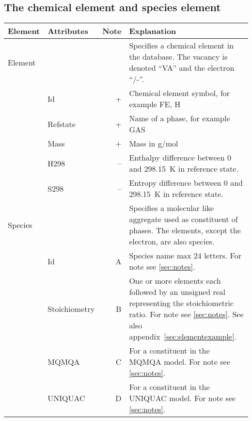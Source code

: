 \documentclass{article}
\begin{document}

\newpage

\subsection{The chemical element and species element}

\bigskip
\begin{tabular}{|p{} p{} r p{}|}\hline
  Element & Attributes & Note & Explanation\\\hline

  Element & && Specifies a chemical element in the database.  The vacancy is denoted ``VA'' and the electron ``/-''.\\
          & Id        & +    & Chemical element symbol, for example FE, H \\
          & Refstate  & +    & Name of a phase, for example GAS \\
          & Mass      & +    & Mass in g/mol\\
          & H298      & --    & Enthalpy difference between 0 and 298.15~K in reference state.\\
          & S298      & --    & Entropy difference between 0 and 298.15~K in reference state.\\\hline

  Species & && Specifies a molecular like aggregate used as constituent of phases.  The elements, except the electron, are also species.\\
          & Id        & A & Species name max 24 letters. For note see \ref{sec:notes}.\\
          & Stoichiometry & B & One or more elements each followed by an unsigned real representing the stoichiometric ratio.  For note see \ref{sec:notes}.  See also appendix~\ref{sec:elementexample}.\\
          & MQMQA & C & For a constituent in the MQMQA model.  For note see \ref{sec:notes}.\\
          & UNIQUAC & D & For a constituent in the UNIQUAC model.  For note see \ref{sec:notes}.\\\hline

\end{tabular}


\newpage 
\end{document}
